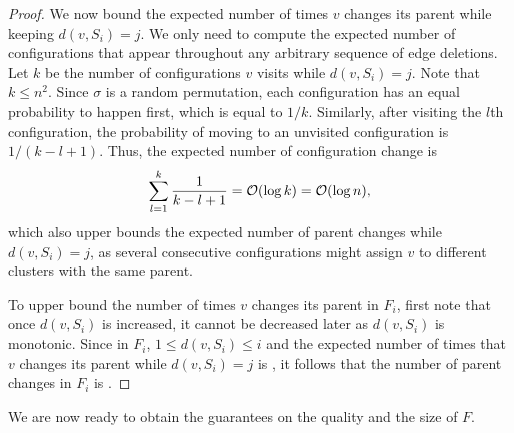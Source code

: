 \begin{proof}
We now bound the expected number of times \( v \) changes its parent while keeping \( d(v, S_i) = j \).
We only need to compute the expected number of configurations that appear throughout any arbitrary sequence of edge deletions.
Let \( k \) be the number of configurations \( v \) visits while \( d(v, S_i) = j \).
Note that \( k \leq n^2 \).
Since \( \sigma \) is a random permutation, each configuration has an equal probability to happen first, which is equal to \( 1/k \).
Similarly, after visiting the \( l \)th configuration, the probability of moving to an unvisited configuration is \( 1/(k - l + 1) \).
Thus, the expected number of configuration change is
\[
\sum_{l = 1} ^{k} \frac{1}{k - l + 1 } = \atmost{\log k} = \atmost{\log n},
\]
which also upper bounds the expected number of parent changes while \( d(v, S_i) = j \), as   several consecutive configurations might assign \( v \) to different clusters with the same parent.

To upper bound the number of times \( v \) changes its parent in \( F_i \), first note that once \( d(v, S_i) \) is increased, it cannot be decreased later as \( d(v, S_i) \) is monotonic.
Since in \( F_i \), \( 1 \leq d(v, S_i) \leq i \) and the expected number of times that \( v \) changes its parent while \( d(v, S_i) = j \) is , it follows that the number of parent changes in \( F_i \) is .
\end{proof}






We are now ready to obtain the guarantees on the quality and the size of \( F \).


